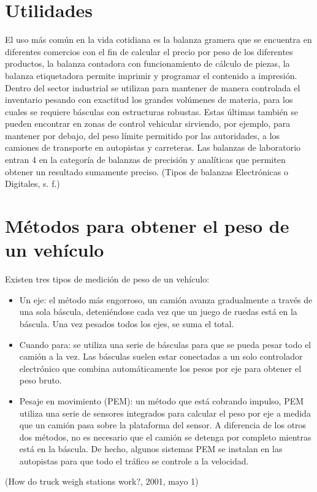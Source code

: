 \documentclass{article}
\begin{document}
{    \section{Utilidades}
        {\noindent El uso más común en la vida cotidiana es la balanza gramera que se encuentra en diferentes comercios
        con el fin de calcular el precio por peso de los diferentes productos, la balanza contadora con
        funcionamiento de cálculo de piezas, la balanza etiquetadora permite imprimir y programar el
        contenido a impresión. Dentro del sector industrial se utilizan para mantener de manera controlada el
        inventario pesando con exactitud los grandes volúmenes de materia, para los cuales se requiere
        básculas con estructuras robustas. Estas últimas también se pueden encontrar en zonas de control
        vehicular sirviendo, por ejemplo, para mantener por debajo, del peso límite permitido por las
        autoridades, a los camiones de transporte en autopistas y carreteras. Las balanzas de laboratorio entran
        4 en la categoría de balanzas de precisión y analíticas que permiten obtener un resultado sumamente
        preciso. (Tipos de balanzas Electrónicas o Digitales, s. f.)}
        
    \section{Métodos para obtener el peso de un vehículo}
        {\noindent Existen tres tipos de medición de peso de un vehículo:}
        \begin{itemize}
        \item Un eje: el método más engorroso, un camión avanza gradualmente a través de una sola
        báscula, deteniéndose cada vez que un juego de ruedas está en la báscula. Una vez pesados
        todos los ejes, se suma el total.
        \item Cuando para: se utiliza una serie de básculas para que se pueda pesar todo el camión a la
        vez. Las básculas suelen estar conectadas a un solo controlador electrónico que combina
        automáticamente los pesos por eje para obtener el peso bruto.
        \item Pesaje en movimiento (PEM): un método que está cobrando impulso, PEM utiliza una serie
        de sensores integrados para calcular el peso por eje a medida que un camión pasa sobre la
        plataforma del sensor. A diferencia de los otros dos métodos, no es necesario que el camión
        se detenga por completo mientras está en la báscula. De hecho, algunos sistemas PEM se
        instalan en las autopistas para que todo el tráfico se controle a la velocidad.
        \end{itemize}
        (How do truck weigh stations work?, 2001, mayo 1)

}
\end{document}
